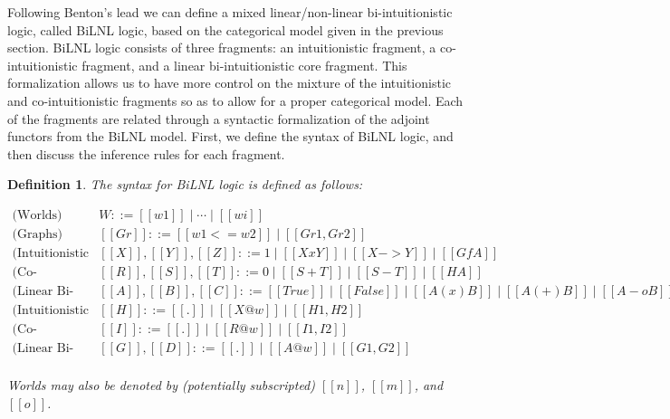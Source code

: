 \documentclass{lmcs}
\newtheorem{definition}[theorem]{Definition}
\begin{document}
Following Benton's \cite{Benton:1994} lead we can define a mixed
linear/non-linear bi-intuitionistic logic, called BiLNL logic, based
on the categorical model given in the previous section.  BiLNL logic
consists of three fragments: an intuitionistic fragment, a
co-intuitionistic fragment, and a linear bi-intuitionistic core
fragment.  This formalization allows us to have more control on the
mixture of the intuitionistic and co-intuitionistic fragments so as to
allow for a proper categorical model.  Each of the fragments are
related through a syntactic formalization of the adjoint functors from
the BiLNL model.  First, we define the syntax of BiLNL logic, and then
discuss the inference rules for each fragment.
\begin{definition}
  \label{def:BiLNL-syntax}
  The syntax for BiLNL logic is defined as follows:
  \begin{center}
    \begin{math}
      \begin{array}{rlllllllllll}
        \text{(Worlds)} & W ::= [[w1]] \mid \cdots \mid [[wi]]\\
        \text{(Graphs)} & [[Gr]] ::= [[w1 <= w2]] \mid [[Gr1 , Gr2]]\\
        \text{(Intuitionistic Formulas)} & [[X]], [[Y]], [[Z]] ::= 1
          \mid [[X x Y]] \mid [[X -> Y]] \mid [[Gf A]]\\
        \text{(Co-intuitionistic Formulas)} &  [[R]], [[S]], [[T]] ::= 0 \mid [[S + T]] \mid [[S - T]] \mid [[H A]]\\
        \text{(Linear Bi-intuitionistic Formulas)} &
             [[A]],[[B]],[[C]] ::= [[True]] \mid [[False]] \mid
             [[A (x) B]] \mid [[A (+) B]] \mid
             [[A -o B]] \mid [[A *- B]] \mid [[F X]] \mid [[J S]]\\
             \text{(Intuitionistic Contexts)}  & [[H]] ::= [[.]] \mid
                  [[X @ w]] \mid [[H1 , H2]]\\
        \text{(Co-intuitionistic Contexts)}  & [[I]] ::= [[.]] \mid
             [[R @ w]] \mid [[I1 , I2]]\\
        \text{(Linear Bi-intuitionistic Contexts)}  &
             [[G]],[[D]] ::= [[.]] \mid [[A @ w]] \mid [[G1,G2]]\\        
      \end{array}
    \end{math}
  \end{center}
  Worlds may also be denoted by (potentially subscripted) $[[n]]$,
  $[[m]]$, and $[[o]]$.


\end{definition}
\end{document}
